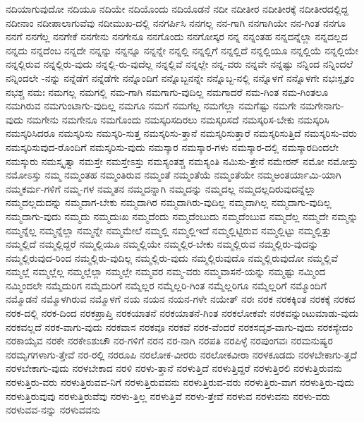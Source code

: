 {ನದಿಯಾಗುವುದೋ
ನದಿಯೂ
ನದಿಯೇ
ನದಿಯೊಂದು
ನದಿಯೊಡನೆ
ನದೀ
ನದೀತೀರ
ನದೀತೀರಕ್ಕೆ
ನದೀತೀರದಲ್ಲಿದ್ದ
ನದೀನಾಂ
ನದೀಪಾಲಾಗುವೆವು
ನದೀಮುಖ-ದಲ್ಲಿ
ನನಗರ್ಪಿಸಿ
ನನಗಲ್ಲ
ನನ-ಗಾಗಿ
ನನಗಾಗಿಯೇ
ನನ-ಗಿಂತ
ನನಗೂ
ನನಗೆ
ನನಗೆಲ್ಲ
ನನಗೇಕೆ
ನನಗೇನು
ನನಗೇನೂ
ನನಗೊಂದು
ನನಗೋಸ್ಕರ
ನನ್ನ
ನನ್ನಂತಹ
ನನ್ನದನ್ನೆಲ್ಲಾ
ನನ್ನದಲ್ಲದ
ನನ್ನದು
ನನ್ನದೆಂಬ
ನನ್ನದೇ
ನನ್ನನ್ನು
ನನ್ನನ್ನೂ
ನನ್ನನ್ನೇ
ನನ್ನಲ್ಲಿ
ನನ್ನಲ್ಲಿಗೆ
ನನ್ನಲ್ಲಿದೆ
ನನ್ನಲ್ಲಿಯೂ
ನನ್ನಲ್ಲಿಯೆ
ನನ್ನಲ್ಲಿಯೇ
ನನ್ನಲ್ಲಿರುವ
ನನ್ನಲ್ಲಿರು-ವುದು
ನನ್ನಲ್ಲಿ-ರು-ವುದೆಲ್ಲ
ನನ್ನಲ್ಲಿವೆ
ನನ್ನಲ್ಲೇ
ನನ್ನ-ವರು
ನನ್ನವೇ
ನನ್ನಷ್ಟು
ನನ್ನಿಂದ
ನನ್ನಿಂದಲೆ
ನನ್ನಿಂದಲೇ
-ನನ್ನು
ನನ್ನೆಡೆಗೆ
ನನ್ನೆಡೆಗೇ
ನನ್ನೊಂದಿಗೆ
ನನ್ನೊಬ್ಬನನ್ನೇ
ನನ್ನೊಬ್ಬ-ನಲ್ಲಿ
ನನ್ನೊಳಗೆ
ನನ್ನೊಳಗೇ
ನಭಃಸ್ಪೃಶಂ
ನಭಶ್ಚ
ನಮಃ
ನಮಗಲ್ಲ
ನಮಗಲ್ಲಿ
ನಮ-ಗಾಗಿ
ನಮಗಾಗು-ವುದಿಲ್ಲ
ನಮಗಾದರೆ
ನಮ-ಗಿಂತ
ನಮ-ಗಿಂತಲೂ
ನಮಗಿರುವ
ನಮಗುಂಟಾಗು-ವುದಿಲ್ಲ
ನಮಗೂ
ನಮಗೆ
ನಮಗೆಲ್ಲ
ನಮಗೆಲ್ಲಾ
ನಮಗೆಷ್ಟು
ನಮಗೇ
ನಮಗೇನಾಗು-ವುದು
ನಮಗೇನು
ನಮಗೇನೂ
ನಮಗೊಂದು
ನಮಸ್ಕರಿಸದಿರಲು
ನಮಸ್ಕರಿಸದೆ
ನಮಸ್ಕರಿಸ-ಬೇಕು
ನಮಸ್ಕರಿಸಿ
ನಮಸ್ಕರಿಸಿದರೂ
ನಮಸ್ಕರಿಸು
ನಮಸ್ಕರಿ-ಸುತ್ತ
ನಮಸ್ಕರಿಸು-ತ್ತಾನೆ
ನಮಸ್ಕರಿಸುತ್ತಾರೆ
ನಮಸ್ಕರಿಸುತ್ತಿದೆ
ನಮಸ್ಕರಿಸು-ವರು
ನಮಸ್ಕರಿಸುವುದ-ರೊಂದಿಗೆ
ನಮಸ್ಕರಿಸು-ವುದು
ನಮಸ್ಕಾರ
ನಮಸ್ಕಾರ-ಗಳು
ನಮಸ್ಕಾರ-ದಲ್ಲಿ
ನಮಸ್ಕಾರದಿಂದಲೇ
ನಮಸ್ಕುರು
ನಮಸ್ಕೃತ್ವಾ
ನಮಸ್ತೇ
ನಮಸ್ತೇಽಸ್ತು
ನಮಸ್ಯಂತಶ್ಚ
ನಮಸ್ಯಂತಿ
ನಮಿಸು-ತ್ತೇನೆ
ನಮೇರನ್
ನಮೋ
ನಮೋಸ್ತು
ನಮೋಽಸ್ತು
ನಮ್ಮ
ನಮ್ಮಂತಹ
ನಮ್ಮಂತಿರುವ
ನಮ್ಮಂತೆ
ನಮ್ಮಂತೆಯೆ
ನಮ್ಮಂತೆಯೇ
ನಮ್ಮಅಂತರ್ಯಾಮಿ-ಯಾಗಿ
ನಮ್ಮಕರ್ಮ-ಗಳಿಗೆ
ನಮ್ಮ-ಗಳ
ನಮ್ಮತನ
ನಮ್ಮದನ್ನಾಗಿ
ನಮ್ಮದನ್ನು
ನಮ್ಮದಲ್ಲ
ನಮ್ಮದಲ್ಲದಿರುವುದನ್ನೆಲ್ಲಾ
ನಮ್ಮದಲ್ಲದುದನ್ನು
ನಮ್ಮದಾಗ-ಬೇಕು
ನಮ್ಮದಾಗಿರ
ನಮ್ಮದಾಗಿರು-ವುದಿಲ್ಲ
ನಮ್ಮದಾಗಿಲ್ಲ
ನಮ್ಮದಾಗು-ವುದಿಲ್ಲ
ನಮ್ಮದಾಗು-ವುದು
ನಮ್ಮದು
ನಮ್ಮದುಃಖ
ನಮ್ಮದೆಂದು
ನಮ್ಮದೆಂಬುದು
ನಮ್ಮದೆಂಬುವ
ನಮ್ಮದೆಲ್ಲ
ನಮ್ಮದೇ
ನಮ್ಮನ್ನು
ನಮ್ಮನ್ನೆಲ್ಲ
ನಮ್ಮನ್ನೆಲ್ಲಾ
ನಮ್ಮನ್ನೇ
ನಮ್ಮಮೇಲೆ
ನಮ್ಮಲ್ಲಿ
ನಮ್ಮಲ್ಲಿಇದೆ
ನಮ್ಮಲ್ಲಿಟ್ಟಿರುವ
ನಮ್ಮಲ್ಲಿಟ್ಟು
ನಮ್ಮಲ್ಲಿತ್ತು
ನಮ್ಮಲ್ಲಿದೆ
ನಮ್ಮಲ್ಲಿದ್ದರೆ
ನಮ್ಮಲ್ಲಿಯೂ
ನಮ್ಮಲ್ಲಿಯೇ
ನಮ್ಮಲ್ಲಿರ-ಬೇಕು
ನಮ್ಮಲ್ಲಿರುವ
ನಮ್ಮಲ್ಲಿರು-ವುದನ್ನು
ನಮ್ಮಲ್ಲಿರುವುದ-ರಿಂದ
ನಮ್ಮಲ್ಲಿರು-ವುದಿಲ್ಲ
ನಮ್ಮಲ್ಲಿರು-ವುದು
ನಮ್ಮಲ್ಲಿರುವುದೊ
ನಮ್ಮಲ್ಲಿರುವುದೋ
ನಮ್ಮಲ್ಲಿವೆ
ನಮ್ಮಲ್ಲೆ
ನಮ್ಮಲ್ಲೆಲ್ಲ
ನಮ್ಮಲ್ಲೆಲ್ಲಾ
ನಮ್ಮಲ್ಲೇ
ನಮ್ಮವರ
ನಮ್ಮ-ವರು
ನಮ್ಮವಾಸನೆ-ಯನ್ನು
ನಮ್ಮಷ್ಟು
ನಮ್ಮಿಂದ
ನಮ್ಮಿಂದಲೇ
ನಮ್ಮೆದುರಿಗ
ನಮ್ಮೆದುರಿಗೆ
ನಮ್ಮೆಲ್ಲರ
ನಮ್ಮೆಲ್ಲರಿ-ಗಿಂತ
ನಮ್ಮೆಲ್ಲರಿಗೂ
ನಮ್ಮೆಲ್ಲರಿಗೆ
ನಮ್ಮೊಂದಿಗೆ
ನಮ್ಮೊಡನೆ
ನಮ್ಮೊಳಗಿರುವ
ನಮ್ಮೊಳಗೆ
ನಯ
ನಯನ
ನಯನ-ಗಳೇ
ನಯೇತ್
ನರಃ
ನರಕ
ನರಕಕ್ಕಿಂತ
ನರಕಕ್ಕೆ
ನರಕದ
ನರಕ-ದಲ್ಲಿ
ನರಕ-ದಿಂದ
ನರಕಪ್ರಾಪ್ತಿ
ನರಕಯಾತನೆ
ನರಕಯಾತನೆ-ಗಿಂತ
ನರಕಲೋಕವೇ
ನರಕವನ್ನುಂಟುಮಾಡು-ವುದು
ನರಕವಲ್ಲದೆ
ನರಕ-ವಾಗು-ವುದು
ನರಕವಾಸ
ನರಕವೂ
ನರಕವೆ
ನರಕ-ವೆಂದರೆ
ನರಕಸದೃಶ-ವಾಗು-ವುದು
ನರಕಸ್ಯೇದಂ
ನರಕಾಯೈವ
ನರಕೇ
ನರಕೇಽಶುಚೌ
ನರ-ಗಳಿಗೆ
ನರನ
ನರ-ನಾಗಿ
ನರಪತಿ
ನರಪಿಳ್ಳೆ
ನರಪುಂಗವಃ
ನರಮನುಷ್ಯರ
ನರಮೃಗಗಳಾಗು-ತ್ತೇವೆ
ನರ-ರಲ್ಲಿ
ನರರೂಪಿ
ನರಲೋಕ-ವೀರರು
ನರಲೋಕವೀರಾ
ನರಳಕೂಡದು
ನರಳಬೇಕಾಗು-ತ್ತದೆ
ನರಳಬೇಕಾಗು-ವುದು
ನರಳಬೇಕಾದ
ನರಳಿ
ನರಳು-ತ್ತಾನೆ
ನರಳುತ್ತಿದೆ
ನರಳುತ್ತಿದ್ದರೆ
ನರಳುತ್ತಿರಲಿ
ನರಳುತ್ತಿರುವನು
ನರಳುತ್ತಿರು-ವರು
ನರಳುತ್ತಿರುವವ-ನಿಗೆ
ನರಳುತ್ತಿರುವವನು
ನರಳುತ್ತಿರುವ-ವರು
ನರಳುತ್ತಿರು-ವಾಗ
ನರಳುತ್ತಿರು-ವುದು
ನರಳುತ್ತಿರುವುವು
ನರಳುತ್ತಿರುವೆವು
ನರಳು-ತ್ತಿಲ್ಲ
ನರಳುತ್ತಿವೆ
ನರಳು-ತ್ತೇವೆ
ನರಳುವ
ನರಳುವನು
ನರಳು-ವರು
ನರಳುವವ-ನನ್ನು
ನರಳುವವನು
}
